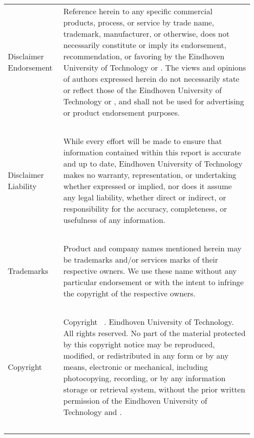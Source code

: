 \begin{longtable}{L{3cm}J{11cm}}
    Disclaimer Endorsement		& Reference herein to any specific commercial products, process, or service by trade name, trademark, manufacturer, or otherwise, does not necessarily constitute or imply its endorsement, recommendation, or favoring by the Eindhoven University of Technology or \client. The views and opinions of authors expressed herein do not necessarily state or reflect those of the Eindhoven University of Technology or \client, and shall not be used for advertising or product endorsement purposes.\\
    ~ & ~\\
    Disclaimer Liability			& While every effort will be made to ensure that information contained within this report is accurate and up to date, Eindhoven University of Technology makes no warranty, representation, or undertaking whether expressed or implied, nor does it assume any legal liability, whether direct or indirect, or responsibility for the accuracy, completeness, or usefulness of any information. \\
    ~ & ~\\
    Trademarks				& Product and company names mentioned herein may be trademarks and/or services marks of their respective owners. We use these name without any particular endorsement or with the intent to infringe the copyright of the respective owners.\\
    ~ & ~\\
    Copyright					& Copyright \textcopyright\ \gradyear. Eindhoven University of Technology. All rights reserved. No part of the material protected by this copyright notice may be reproduced, modified, or redistributed in any form or by any means, electronic or mechanical, including photocopying, recording, or by any information storage or retrieval system, without the prior written permission of the Eindhoven University of Technology and \client.\\
    ~ & ~\\
\end{longtable}